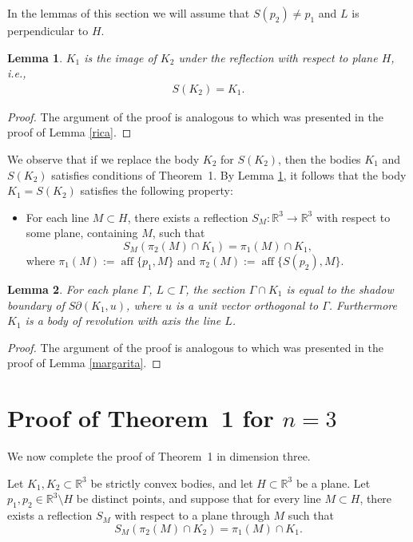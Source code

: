 \documentclass[12pt]{article}
\newcommand{\aff}{\operatorname*{aff}}
\newcommand{\Rt}{\mathbb{R}^3}
\newtheorem{lemma}{Lemma}
\begin{document}
In the lemmas of this section we will assume that $S(p_2)\not=p_1$ and $L$ is perpendicular to $H$. 
\begin{lemma}\label{isabella2} 
$K_1$ is the image of $K_2$ under the reflection with respect to plane $H$, i.e., 
\begin{eqnarray}\label{chacha}
S(K_2)=K_1.
\end{eqnarray}
\end{lemma}

\begin{proof}
The argument of the proof is analogous to which was presented in the proof of Lemma \ref{rica}.
\end{proof}

We observe that if we replace the body $K_2$ for $S(K_2)$, then the bodies $K_1$ and $S(K_2)$ satisfies conditions of Theorem~1. By Lemma \ref{isabella2}, it follows that the body $K_1=S(K_2)$ satisfies the following property:
\begin{itemize} 
\item[(**)] For each line $M\subset  H$,
there exists a reflection $S_{M}:\Rt \rightarrow \Rt$ with respect to some plane, containing $M$, such that
\[
S_{M}(\pi_{2}(M)\cap  K_1)= \pi_{1}(M)\cap K_{1},
\]
where $\pi_{1}(M):=\aff\{p_1,M\}$ and $\pi_{2}(M):=\aff\{S(p_2),M\}$. 
\end{itemize}


\begin{lemma}\label{margarita2}
For each plane $\Gamma$, $L\subset \Gamma$, the section $\Gamma \cap K_1$ is equal to the shadow boun\-da\-ry of $S\partial(K_1,u)$, where 
$u$ is a unit vector orthogonal to $\Gamma$. Furthermore $K_1$ is a body of revolution with axis the line $L$.
\end{lemma}
\begin{proof}
The argument of the proof is analogous to which was presented in the proof of Lemma \ref{margarita}.
\end{proof} 

\section{Proof of Theorem~1 for $n = 3$}

We now complete the proof of Theorem~1 in dimension three.

Let $K_1, K_2 \subset \mathbb{R}^3$ be strictly convex bodies, and let $H \subset \mathbb{R}^3$ be a plane. Let $p_1, p_2 \in \mathbb{R}^3 \setminus H$ be distinct points, and suppose that for every line $M \subset H$, there exists a reflection $S_M$ with respect to a plane through $M$ such that
\[
S_M(\pi_2(M) \cap K_2) = \pi_1(M) \cap K_1.
\]
\end{document}
